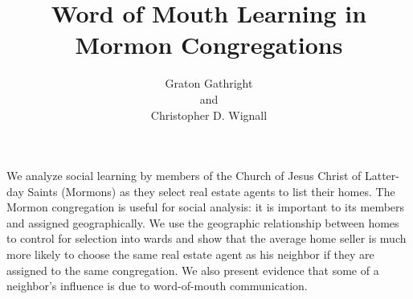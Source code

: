 \documentclass[12pt]{article}
\title{Word of Mouth Learning in Mormon Congregations}
\author{Graton Gathright \\and\\Christopher D. Wignall}
\begin{document}
\newcommand{\se}[1]{\footnotesize{(#1)}}
\newcommand{\capbot}[1]{\vspace{8pt}\footnotesize\raggedright #1}
\pagestyle{empty}

\maketitle

%
%

{\abstract
    We analyze social learning by members of the Church of Jesus Christ of Latter-day Saints (Mormons) as they select
    real estate agents to list their homes. The Mormon congregation is useful for social analysis: it is important to its members and assigned
    geographically. We use the geographic relationship between homes to control for selection into wards and show that the average home seller is much
    more likely to choose the same real estate agent as his neighbor if they are assigned to the same congregation. We also present evidence that some
    of a neighbor's influence is due to word-of-mouth communication.
}
\end{document}
